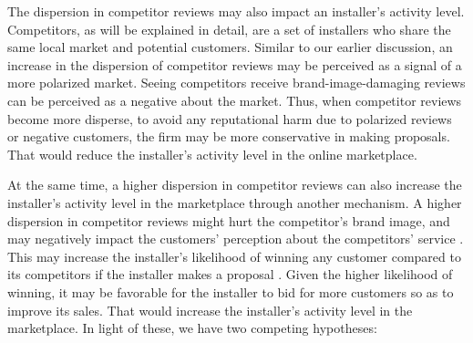\documentclass[mnsc,blindrev]{informs3}
\begin{document}
The dispersion in competitor reviews may also impact an installer's activity level. Competitors, as will be explained in detail, are a set of installers who share the same local market and potential customers. Similar to our earlier discussion, an increase in the dispersion of competitor reviews may be perceived as a signal of a more polarized market. Seeing competitors receive brand-image-damaging reviews can be perceived as a negative about the market. Thus, when competitor reviews become more disperse, to avoid any reputational harm due to polarized reviews or negative customers, the firm may be more conservative in making proposals. That would reduce the installer's activity level in the online marketplace.
%
%


At the same time, a higher dispersion in competitor reviews can also increase the installer's activity level in the marketplace through another mechanism. A higher dispersion in competitor reviews might hurt the competitor's brand image, and may negatively impact the customers' perception about the competitors' service \citep{chakraborty2018credibility,chakraborty2018effects,Zhu}. This may increase the installer's likelihood of winning any customer compared to its competitors if the installer makes a proposal \citep{demirag2011risks,moreno2014doing}. Given the higher likelihood of winning, it may be favorable for the installer to  bid for more customers so as to improve its sales. That would increase the installer's activity level in the marketplace. In light of these, we have two competing hypotheses:
\end{document}
